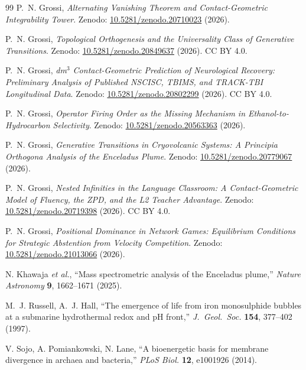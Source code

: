 \documentclass[12pt,a4paper,twoside]{book}
\theoremstyle{plain}
\theoremstyle{definition}
\theoremstyle{definition}
\begin{document}
\begin{thebibliography}{99}
 P.~N. Grossi, \emph{Alternating Vanishing Theorem and
  Contact-Geometric Integrability Tower}.
  Zenodo: \href{https://doi.org/10.5281/zenodo.20710023}{10.5281/zenodo.20710023} (2026).

 P.~N. Grossi, \emph{Topological Orthogenesis and the Universality Class
  of Generative Transitions}.
  Zenodo: \href{https://doi.org/10.5281/zenodo.20849637}{10.5281/zenodo.20849637} (2026).
  CC BY 4.0.

 P.~N. Grossi, \emph{dm$^{3}$ Contact-Geometric Prediction of
  Neurological Recovery: Preliminary Analysis of Published NSCISC, TBIMS, and TRACK-TBI
  Longitudinal Data}.
  Zenodo: \href{https://doi.org/10.5281/zenodo.20802299}{10.5281/zenodo.20802299} (2026).
  CC BY 4.0.

 P.~N. Grossi, \emph{Operator Firing Order as the Missing Mechanism
  in Ethanol-to-Hydrocarbon Selectivity}.
  Zenodo: \href{https://doi.org/10.5281/zenodo.20563363}{10.5281/zenodo.20563363} (2026).

 P.~N. Grossi, \emph{Generative Transitions in Cryovolcanic Systems:
  A Principia Orthogona Analysis of the Enceladus Plume}.
  Zenodo: \href{https://doi.org/10.5281/zenodo.20779067}{10.5281/zenodo.20779067} (2026).

 P.~N. Grossi, \emph{Nested Infinities in the Language Classroom:
  A Contact-Geometric Model of Fluency, the ZPD, and the L2 Teacher Advantage}.
  Zenodo: \href{https://doi.org/10.5281/zenodo.20719398}{10.5281/zenodo.20719398} (2026).
  CC BY 4.0.

 P.~N. Grossi, \emph{Positional Dominance in Network Games:
  Equilibrium Conditions for Strategic Abstention from Velocity Competition}.
  Zenodo: \href{https://doi.org/10.5281/zenodo.21013066}{10.5281/zenodo.21013066} (2026).

 N. Khawaja \emph{et al.}, ``Mass spectrometric analysis of the Enceladus plume,''
  \emph{Nature Astronomy} \textbf{9}, 1662--1671 (2025).

 M.~J. Russell, A.~J. Hall, ``The emergence of life from iron monosulphide bubbles at a submarine hydrothermal redox and pH front,''
  \emph{J.~Geol.~Soc.} \textbf{154}, 377--402 (1997).

 V. Sojo, A. Pomiankowski, N. Lane, ``A bioenergetic basis for membrane divergence in archaea and bacteria,''
  \emph{PLoS Biol.} \textbf{12}, e1001926 (2014).


\end{thebibliography}
\end{document}
